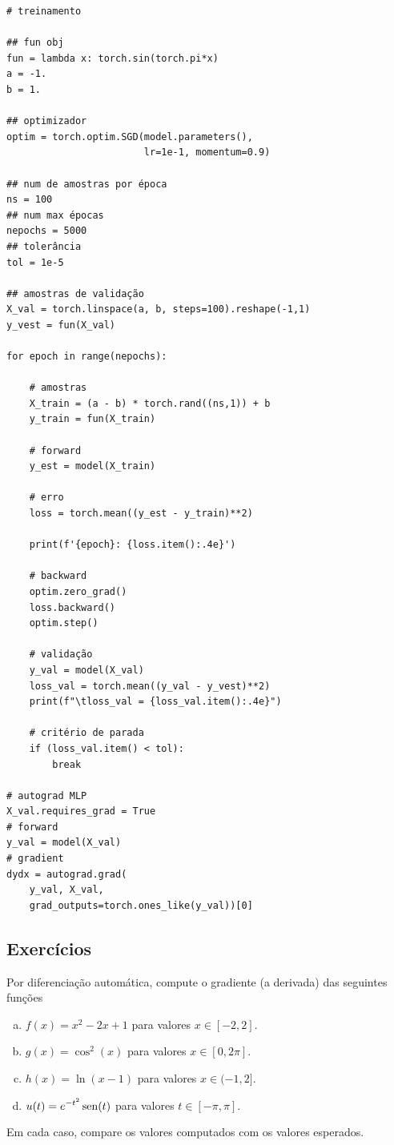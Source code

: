 \begin{ex}
\begin{lstlisting}[caption=mlp\_autograd\_apfun1d.py]
# treinamento

## fun obj
fun = lambda x: torch.sin(torch.pi*x)
a = -1.
b = 1.

## optimizador
optim = torch.optim.SGD(model.parameters(),
                        lr=1e-1, momentum=0.9)

## num de amostras por época
ns = 100
## num max épocas
nepochs = 5000
## tolerância
tol = 1e-5

## amostras de validação
X_val = torch.linspace(a, b, steps=100).reshape(-1,1)
y_vest = fun(X_val)

for epoch in range(nepochs):

    # amostras
    X_train = (a - b) * torch.rand((ns,1)) + b
    y_train = fun(X_train)
    
    # forward
    y_est = model(X_train)

    # erro
    loss = torch.mean((y_est - y_train)**2)

    print(f'{epoch}: {loss.item():.4e}')

    # backward
    optim.zero_grad()
    loss.backward()
    optim.step()

    # validação
    y_val = model(X_val)
    loss_val = torch.mean((y_val - y_vest)**2)
    print(f"\tloss_val = {loss_val.item():.4e}")
    
    # critério de parada
    if (loss_val.item() < tol):
        break

# autograd MLP
X_val.requires_grad = True
# forward
y_val = model(X_val)
# gradient
dydx = autograd.grad(
    y_val, X_val,
    grad_outputs=torch.ones_like(y_val))[0]
\end{lstlisting}
\end{ex}

\subsection{Exercícios}

\begin{exer}\label{exer:mlp_autograd_f1d}
  Por diferenciação automática, compute o gradiente (a derivada) das seguintes funções
  \begin{enumerate}[a)]
  \item $\displaystyle f(x) = x^2 - 2x + 1$ para valores $x\in [-2, 2]$.
  \item $\displaystyle g(x) = \cos^2(x)$ para valores $x\in [0, 2\pi]$.
  \item $\displaystyle h(x) = \ln(x-1)$ para valores $x\in (-1, 2]$.
  \item $\displaystyle u(t) = e^{-t^2}\operatorname{sen}(t)$ para valores $t\in [-\pi, \pi]$.
  \end{enumerate}
  Em cada caso, compare os valores computados com os valores esperados.
\end{exer}


